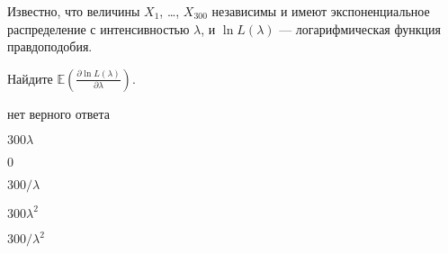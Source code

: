 
\begin{question}
Известно, что величины \(X_1\), \ldots, \(X_{300}\) независимы и имеют
экспоненциальное распределение с интенсивностью \(\lambda\), и
\(\ln L(\lambda)\) --- логарифмическая функция правдоподобия.

Найдите
\(\mathbb{E}\left(\frac{\partial \ln L(\lambda)}{\partial\lambda} \right)\).
\begin{answerlist}
  \item нет верного ответа
  \item \(300\lambda\)
  \item \(0\)
  \item \(300/\lambda\)
  \item \(300\lambda^2\)
  \item \(300/\lambda^2\)
\end{answerlist}
\end{question}


